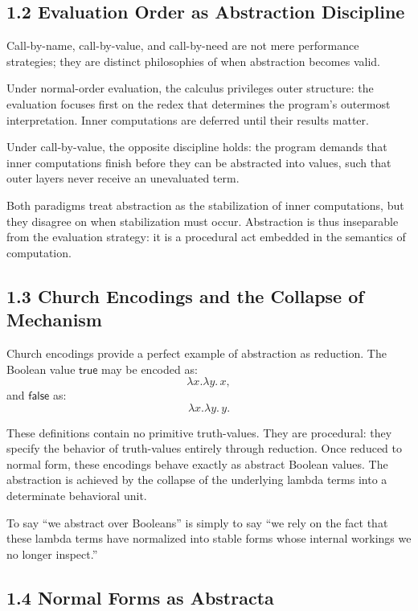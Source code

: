 \documentclass[12pt,letterpaper]{article}
\theoremstyle{remark}
\begin{document}
\subsection{1.2 Evaluation Order as Abstraction Discipline}

Call-by-name, call-by-value, and call-by-need are not mere performance strategies; they are distinct philosophies of when abstraction becomes valid.

Under normal-order evaluation, the calculus privileges outer structure: the evaluation focuses first on the redex that determines the program’s outermost interpretation. Inner computations are deferred until their results matter.

Under call-by-value, the opposite discipline holds: the program demands that inner computations finish before they can be abstracted into values, such that outer layers never receive an unevaluated term.

Both paradigms treat abstraction as the stabilization of inner computations, but they disagree on when stabilization must occur. Abstraction is thus inseparable from the evaluation strategy: it is a procedural act embedded in the semantics of computation.

\subsection{1.3 Church Encodings and the Collapse of Mechanism}

Church encodings provide a perfect example of abstraction as reduction. The Boolean value \(\mathsf{true}\) may be encoded as:
\[
\lambda x.\lambda y.\, x,
\]
and \(\mathsf{false}\) as:
\[
\lambda x.\lambda y.\, y.
\]

These definitions contain no primitive truth-values. They are procedural: they specify the behavior of truth-values entirely through reduction. Once reduced to normal form, these encodings behave exactly as abstract Boolean values. The abstraction is achieved by the collapse of the underlying lambda terms into a determinate behavioral unit.

To say “we abstract over Booleans” is simply to say “we rely on the fact that these lambda terms have normalized into stable forms whose internal workings we no longer inspect.”

\subsection{1.4 Normal Forms as Abstracta}
\end{document}
